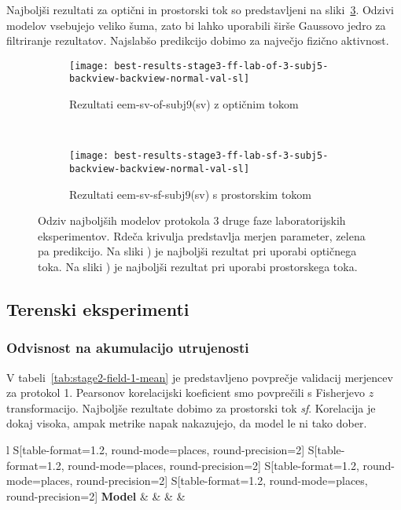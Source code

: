 Najboljši rezultati za optični in prostorski tok so predstavljeni na sliki~\ref{fig:lab-3}. Odzivi modelov vsebujejo veliko šuma, zato bi lahko uporabili širše Gaussovo jedro za filtriranje rezultatov. Najslabšo predikcijo dobimo za največjo fizično aktivnost.

\begin{figure}[!htbp]
	\centering
	\begin{subfigure}[t]{0.45\columnwidth}
		\texttt{[image: best-results-stage3-ff-lab-of-3-subj5-backview-backview-normal-val-sl]}
		\caption{Rezultati eem-sv-of-subj9(sv) z optičnim tokom}
		\label{fig:lab-of-3}
	\end{subfigure}
	~
	\begin{subfigure}[t]{0.45\columnwidth}
		\texttt{[image: best-results-stage3-ff-lab-sf-3-subj5-backview-backview-normal-val-sl]}
		\caption{Rezultati eem-sv-sf-subj9(sv) s prostorskim tokom}
		\label{fig:lab-sf-3}
	\end{subfigure}
	\caption[Odziv SUBJ9 modelov protokola 3 faze 2 lab. eksperimentov]{Odziv najboljših modelov protokola 3 druge faze laboratorijskih eksperimentov. Rdeča krivulja predstavlja merjen parameter, zelena pa predikcijo. Na sliki ) je najboljši rezultat pri uporabi optičnega toka. Na sliki ) je najboljši rezultat pri uporabi prostorskega toka.}
	\label{fig:lab-3}
\end{figure}

\subsection{Terenski eksperimenti}
\subsubsection{Odvisnost na akumulacijo utrujenosti}
V tabeli~\ref{tab:stage2-field-1-mean} je predstavljeno povprečje validacij merjencev za protokol 1. Pearsonov korelacijski koeficient \corr smo povprečili s Fisherjevo $z$ transformacijo. Najboljše rezultate dobimo za prostorski tok \textit{sf}. Korelacija je dokaj visoka, ampak metrike napak nakazujejo, da model le ni tako dober.

\begin{table}[!htbp]
	\centering
	\begin{tabular}{l S[table-format=1.2, round-mode=places, round-precision=2] S[table-format=1.2, round-mode=places, round-precision=2] S[table-format=1.2, round-mode=places, round-precision=2] S[table-format=1.2, round-mode=places, round-precision=2]}
		\toprule
		\textbf{Model} & \thead{\corr} & \thead{\rae} & \thead{\rrse} & \theadm{\nsv}\\
		\midrule
		\bottomrule
	\end{tabular}
	\caption[Povprečje validacij merjencev za protokol 1 2. faze terenskih eksperimentov]{Povprečje validacij merjencev za protokol 1 druge faze terenskih eksperimentov. Pearsonov korelacijski koeficient (CORR) smo povprečili s Fisherjevo $z$ transformacijo.}
	\label{tab:stage2-field-1-mean}
\end{table}

